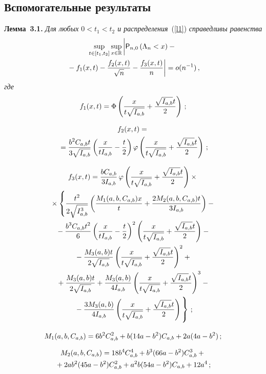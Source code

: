\begin{multicols}{2}
\section{Вспомогательные результаты}

\noindent
\textbf{Лемма~3.1.}
{\it Для любых $0 < t_1 < t_2$ и распределения}~(\ref{l1}) \textit{справедливы равенства}
\begin{multline*}
\sup_{t\in[t_1,t_2]} \sup_{x \in {\mathbb{R}}} 
 \left| \vphantom{\fr{f_2(x)}{\sqrt{n}}}
 {\p}_{n, 0}\left(\Lambda_n < x\right) -{}\right.\\
\left. {}- f_1(x,t)
- \fr{f_2(x,t)}{\sqrt{n}} - \fr{f_3(x,t)}{n}\right| = o(n^{-1})\,,
\end{multline*}
\textit{где}
$$
f_1(x,t) = {\Phi}\left(\displaystyle\frac{\displaystyle x\mathstrut}{\displaystyle t\sqrt{I_{a,b}}\mathstrut} + \displaystyle\frac{\displaystyle \sqrt{I_{a,b}}t\mathstrut}{\displaystyle 2\mathstrut}\right)\,;
$$

\noindent
\begin{multline*}
f_2(x,t) ={}\\
{}= \displaystyle\frac{\displaystyle b^2C_{a,b}t\mathstrut}{\displaystyle 3\sqrt{I_{a,b}}\mathstrut}\left(\displaystyle\frac{\displaystyle x\mathstrut}{\displaystyle tI_{a,b}\mathstrut} - 
\displaystyle\frac{\displaystyle t\mathstrut}{\displaystyle 2\mathstrut}\right) \varphi\left(\displaystyle\frac{\displaystyle x\mathstrut}{\displaystyle t\sqrt{I_{a,b}}\mathstrut} + \displaystyle\frac{\displaystyle \sqrt{I_{a,b}}t\mathstrut}{\displaystyle 2\mathstrut}\right)\,;
\end{multline*}

\noindent
\begin{multline*}
f_3(x,t) = \fr{bC_{a,b}}{3I_{a,b}}\, \varphi\left(\fr{x}{t\sqrt{I_{a,b}}} + 
\fr{\sqrt{I_{a,b}}t}{2}\right) \times{}\\
{}\times \left\{\fr{t^2}{2\sqrt{I^3_{a,b}}}\left(
\fr{M_1(a, b, C_{a,b})x}{t} + \fr{2M_2(a, b, C_{a,b})t}{3I_{a,b}}\right) -{}\right.\\
{}- \fr{b^3C_{a,b}t^2}{6}\left(\fr{x}{tI_{a,b}} - \fr{t}{2}\right)^2\left(
\fr{x}{t\sqrt{I_{a,b}}} + \fr{\sqrt{I_{a,b}}t}{2}\right)- {}\\
{}-
\fr{M_3(a,b)t}{2\sqrt{I_{a,b}}}\left(\fr{x}{t\sqrt{I_{a,b}}}+ 
\fr{\sqrt{I_{a,b}}t}{2}\right)^2 +{}\\
{}
+ \fr{M_3(a,b)t}{2\sqrt{\iab}}+ \fr{M_3(a,b)}{4I_{a,b}}\left(
\fr{x}{t\sqrt{I_{a,b}}} + \fr{\sqrt{I_{a,b}}t}{2}\right)^3 - {}\\
\left.{}-
\fr{3M_3(a,b)}{4I_{a,b}}\left(\fr{x}{t\sqrt{I_{a,b}}} + \fr{\sqrt{I_{a,b}}t}{2}\right)
\vphantom{\fr{t^2}{2\sqrt{I^3_{a,b}}}}
\right\}\,;
\end{multline*}

\noindent
$$
M_1(a, b, C_{a,b}) = 6b^2C_{a,b}^2 + b(14a - b^2)C_{a,b} + 2a(4a - b^2)\,;
$$

\noindent
\begin{multline*}
M_2(a, b, C_{a,b}) = 18b^4C_{a,b}^4 + b^3(66a - b^2)C_{a,b}^3 +{}\\
{}
+ 2ab^2(45a-b^2)C_{a,b}^2 + a^2b(54a - b^2)C_{a,b} + 12a^4\,;
\end{multline*}


\end{multicols}
